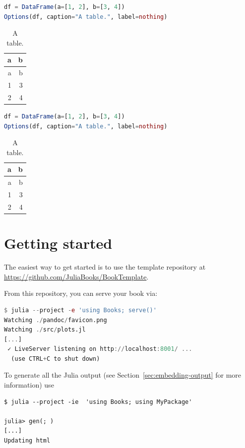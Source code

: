 \documentclass[
  notoc %
]{tufte-book}
\begin{document}
\begin{lstlisting}[language=Julia]
df = DataFrame(a=[1, 2], b=[3, 4])
Options(df, caption="A table.", label=nothing)
\end{lstlisting}

\begin{longtable}[]{@{}rr@{}}
\caption{A table.}\tabularnewline
\toprule()
a & b \\
\midrule()
\endfirsthead
\toprule()
a & b \\
\midrule()
\endhead
1 & 3 \\
2 & 4 \\
\bottomrule()
\end{longtable}

\begin{lstlisting}[language=Julia]
df = DataFrame(a=[1, 2], b=[3, 4])
Options(df, caption="A table.", label=nothing)
\end{lstlisting}

\begin{longtable}[]{@{}rr@{}}
\caption{A table.}\tabularnewline
\toprule()
a & b \\
\midrule()
\endfirsthead
\toprule()
a & b \\
\midrule()
\endhead
1 & 3 \\
2 & 4 \\
\bottomrule()
\end{longtable}

\hypertarget{sec:getting-started}{%
\chapter{Getting started}\label{sec:getting-started}}

The easiest way to get started is to use the template repository at
\url{https://github.com/JuliaBooks/BookTemplate}.

From this repository, you can serve your book via:

\begin{lstlisting}[language=Julia]
$ julia --project -e 'using Books; serve()'
Watching ./pandoc/favicon.png
Watching ./src/plots.jl
[...]
 ✓ LiveServer listening on http://localhost:8001/ ...
  (use CTRL+C to shut down)

\end{lstlisting}

To generate all the Julia output (see Section~\ref{sec:embedding-output}
for more information) use

\begin{lstlisting}
$ julia --project -ie  'using Books; using MyPackage'

julia> gen(; )
[...]
Updating html
\end{lstlisting}
\end{document}
